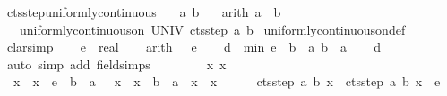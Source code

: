 \documentclass{article}
\theoremstyle{definition}
\begin{document}
\begin{isabellebody}
\isamarkupfalse%
\ cts{\isacharunderscore}step{\isacharunderscore}uniformly{\isacharunderscore}continuous{\isacharcolon}\isanewline
\ \ \ a\ b\isanewline
\ \ \ {\isacharbrackleft}arith{\isacharbrackright}{\isacharcolon}\ {\isachardoublequoteopen}a\ {\isacharless}\ b{\isachardoublequoteclose}\isanewline
\ \ \ {\isachardoublequoteopen}uniformly{\isacharunderscore}continuous{\isacharunderscore}on\ UNIV\ {\isacharparenleft}cts{\isacharunderscore}step\ a\ b{\isacharparenright}{\isachardoublequoteclose}\isanewline
{}\isamarkupfalse%
\ uniformly{\isacharunderscore}continuous{\isacharunderscore}on{\isacharunderscore}def\ \isanewline
{}\isamarkupfalse%
\ {\isacharparenleft}clarsimp{\isacharparenright}\isanewline
\ \ \isamarkupfalse%
\ e\ {\isacharcolon}{\isacharcolon}\ real\isanewline
\ \ \isamarkupfalse%
\ {\isacharbrackleft}arith{\isacharbrackright}{\isacharcolon}\ {\isachardoublequoteopen}{}\ {\isacharless}\ e{\isachardoublequoteclose}\isanewline
\ \ \isamarkupfalse%
\ {\isacharquery}d\ {\isacharequal}\ {\isachardoublequoteopen}min\ {\isacharparenleft}e\ {\isacharasterisk}\ {\isacharparenleft}b\ {\isacharminus}\ a{\isacharparenright}{\isacharparenright}\ {\isacharparenleft}b\ {\isacharminus}\ a{\isacharparenright}{\isachardoublequoteclose}\isanewline
\ \ \isamarkupfalse%
\ {\isachardoublequoteopen}{\isacharquery}d\ {\isachargreater}\ {}{\isachardoublequoteclose}\ \isamarkupfalse%
\ {\isacharparenleft}auto\ simp\ add{\isacharcolon}\ field{\isacharunderscore}simps{\isacharparenright}\isanewline
\ \ \isacommand{{\isacharbraceleft}}\isamarkupfalse%
\isanewline
\ \ \ \ \isamarkupfalse%
\ x\ x{\isacharprime}\isanewline
\ \ \ \ \isamarkupfalse%
\ {}{\isacharcolon}\ {\isachardoublequoteopen}{\isasymbar}x{\isacharprime}\ {\isacharminus}\ x{\isasymbar}\ {\isacharless}\ e\ {\isacharasterisk}\ {\isacharparenleft}b\ {\isacharminus}\ a{\isacharparenright}{\isachardoublequoteclose}\ \ {}{\isacharcolon}\ {\isachardoublequoteopen}{\isasymbar}x{\isacharprime}\ {\isacharminus}\ x{\isasymbar}\ {\isacharless}\ b\ {\isacharminus}\ a{\isachardoublequoteclose}\ \ {\isachardoublequoteopen}x\ {\isasymle}\ x{\isacharprime}{\isachardoublequoteclose}\isanewline
\ \ \ \ \isamarkupfalse%
\ {\isachardoublequoteopen}{\isasymbar}cts{\isacharunderscore}step\ a\ b\ x{\isacharprime}\ {\isacharminus}\ cts{\isacharunderscore}step\ a\ b\ x{\isasymbar}\ {\isacharless}\ e{\isachardoublequoteclose}\isanewline

\end{isabellebody}
\end{document}

